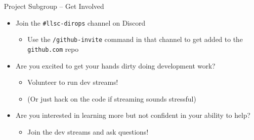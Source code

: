 \documentclass[aspectratio=169]{beamer}
\begin{document}
\begin{frame}{Project Subgroup -- Get Involved}
	\begin{itemize}
		\item Join the \texttt{\#llsc-dirops} channel on Discord
		      \begin{itemize}
			      \item Use the \texttt{/github-invite} command in that channel to get added to the \texttt{github.com} repo
		      \end{itemize}
		      \vspace{1em}
		\item Are you excited to get your hands dirty doing development work?
		      \begin{itemize}
			      \item Volunteer to run dev streams!
			      \item (Or just hack on the code if streaming sounds stressful)
		      \end{itemize}
		      \vspace{1em}
		\item Are you interested in learning more but not confident in your ability to help?
		      \begin{itemize}
			      \item Join the dev streams and ask questions!
		      \end{itemize}
	\end{itemize}
\end{frame}
\end{document}
